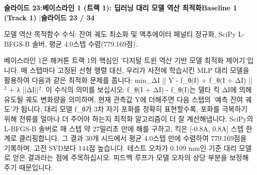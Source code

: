 \documentclass[11pt,a4paper]{article}
\begin{document}
{}
\noindent\begin{tcolorbox}[colback=navy,colframe=navy,left=6pt,right=6pt,top=3pt,bottom=3pt,boxrule=0pt,arc=2pt]
{\large\bfseries\color{white}슬라이드 23:\enspace 베이스라인 1 (트랙 1): 딥러닝 대리 모델 역산 최적화}\hfill{\footnotesize\bfseries\color{white!85!lightbg}Baseline 1 (Track 1) \enspace$|$\enspace 슬라이드 23 / 34}
\end{tcolorbox}
\vspace{0.2em}
\begin{tcolorbox}[colback=lightbg,colframe=bordergray,title={\footnotesize\bfseries\color{darkgray}슬라이드 시각 구성 요약},fontupper=\small,left=6pt,right=6pt,top=2.5pt,bottom=2.5pt,boxrule=0.6pt,arc=2.5pt]
모델 역산 목적함수 수식: 잔여 궤도 최소화 및 액추에이터 페널티 정규화, SciPy L-BFGS-B 솔버, 평균 4.0스텝 수렴(779.169점).
\end{tcolorbox}
\vspace{0.2em}
\begin{tcolorbox}[colback=white,colframe=primaryblue,title={\footnotesize\bfseries\color{white}발표자 구두 대본 (Spoken Script)},fontupper=\small,left=6pt,right=6pt,top=3pt,bottom=3pt,boxrule=0.8pt,arc=2.5pt]
베이스라인 1은 해커톤 트랙 1의 핵심인 '디지털 트윈 역산 기반 모델 최적화 제어기'입니다. 매 스텝마다 고정된 선형 행렬 대신, 우리가 사전에 학습시킨 MLP 대리 모델을 활용하여 다음과 같은 최적화 문제를 풉니다: min\_{ΔI} || Y - f\_θ(I) + f\_θ(I + ΔI) ||$^2$ + λ ||ΔI||$^2$. 이 수식의 의미를 보십시오: f\_θ(I + ΔI) - f\_θ(I)는 델타 킥 ΔI에 의해 유도될 궤도 변화량을 의미하며, 현재 관측값 Y에 더해주면 다음 스텝의 '예측 잔여 궤도'가 됩니다. 대리 모델 f\_θ가 3차 자기 포화를 정확히 표현할수록, 포화를 극복하기 위해 전류를 얼마나 더 주어야 하는지 최적화 알고리즘이 더 잘 계산해냅니다. SciPy의 L-BFGS-B 솔버로 매 스텝 약 27밀리초 만에 해를 구하고, 킥은 [-0.8A, 0.8A] 스텝 한계로 클리핑합니다. 그 결과 30개 시드에서 평균 4.0스텝 만에 수렴하여 779.169점을 기록하며, 고전 SVD보다 144점 높습니다. 테스트 오차가 0.109 mm인 기준 대리 모델로 얻은 결과라는 점에 주목하십시오. 피드백 루프가 모델 오차의 상당 부분을 보정해 주기 때문입니다.
\end{tcolorbox}
\vspace{0.2em}
\end{document}
